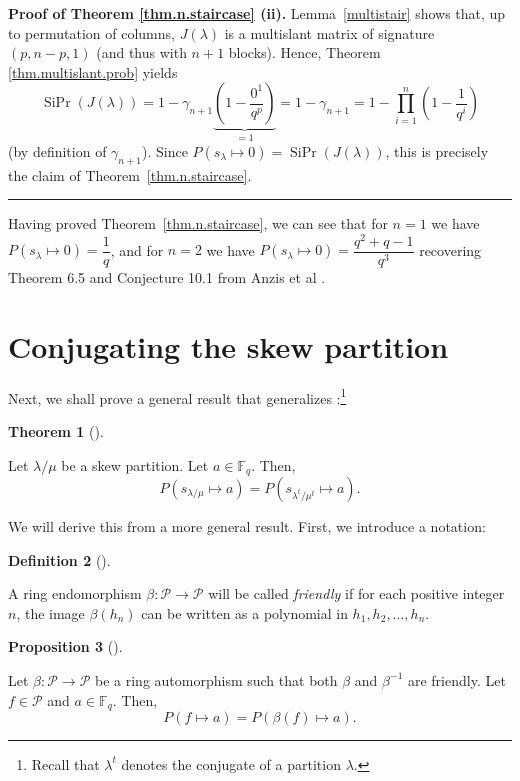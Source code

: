 \documentclass[numbers=enddot,12pt,final,onecolumn,notitlepage]{scrartcl}%
\theoremstyle{definition}
\newtheorem{theo}{Theorem}[section]
\newenvironment{theorem}[1][]
{\begin{theo}[#1]\begin{leftbar}}
{\end{leftbar}\end{theo}}
\newtheorem{prop}[theo]{Proposition}
\newenvironment{proposition}[1][]
{\begin{prop}[#1]\begin{leftbar}}
{\end{leftbar}\end{prop}}
\newtheorem{defi}[theo]{Definition}
\newenvironment{definition}[1][]
{\begin{defi}[#1]\begin{leftbar}}
{\end{leftbar}\end{defi}}
\newenvironment{proof}[1][Proof]{\noindent\textbf{#1.} }{\ \rule{0.5em}{0.5em}}
\let\prodnonlimits\prod
\renewcommand{\prod}{\prodnonlimits\limits}
\newcommand{\tup}[1]{\left( #1 \right)}
\theoremstyle{plainsl}
\begin{document}
\begin{proof}[Proof of Theorem \ref{thm.n.staircase} (ii)]
Lemma~\ref{multistair} shows that, up to permutation of columns,
$J(\lambda)$ is a multislant matrix of signature $(p, n-p, 1)$
(and thus with $n+1$ blocks).
Hence, Theorem \ref{thm.multislant.prob} yields
\[
\operatorname*{SiPr}\tup{J\tup{\lambda}}
= 1 - \gamma_{n+1} \underbrace{\tup{1 - \dfrac{0^1}{q^p}}}_{= 1}
= 1 - \gamma_{n+1}
= 1 - \prod_{i=1}^{n} \left(  1-\dfrac{1}{q^{i}}\right)
\]
(by definition of $\gamma_{n+1}$).
Since $P(s_{\lambda} \longmapsto 0) = \operatorname*{SiPr}\tup{J\tup{\lambda}}$,
this is precisely the claim of Theorem~\ref{thm.n.staircase}.
\end{proof}

Having proved Theorem~\ref{thm.n.staircase}, we can see that for $n=1$
we have
$P(s_{\lambda} \longmapsto 0) = \dfrac{1}{q}$, and for $n=2$ we have
$P(s_{\lambda} \longmapsto 0) = \dfrac{q^2+q-1}{q^3}$
recovering Theorem 6.5 and Conjecture 10.1 from Anzis et al \cite{Anzis18}.


\section{Conjugating the skew partition}

Next, we shall prove a general result that generalizes \cite[Corollary
3.3]{Anzis18}:\footnote{Recall that $\lambda^{t}$ denotes the conjugate of a
partition $\lambda$.}

\begin{theorem}
\label{thm.transpose}Let $\lambda/\mu$ be a skew partition. Let $a\in
\mathbb{F}_{q}$. Then,
\[
P\left(  s_{\lambda/\mu}\mapsto a\right)  =P\left(  s_{\lambda^{t}/\mu^{t}%
}\mapsto a\right)  .
\]

\end{theorem}

We will derive this from a more general result. First, we introduce a notation:

\begin{definition}
A ring endomorphism $\beta:\mathcal{P}\rightarrow\mathcal{P}$ will be called
\emph{friendly} if for each positive integer $n$, the image $\beta\left(
h_{n}\right)  $ can be written as a polynomial in $h_{1},h_{2},\ldots,h_{n}$.
\end{definition}

\begin{proposition}
\label{prop.friendly-aut}Let $\beta:\mathcal{P}\rightarrow\mathcal{P}$ be a
ring automorphism such that both $\beta$ and $\beta^{-1}$ are friendly. Let
$f\in\mathcal{P}$ and $a\in\mathbb{F}_{q}$. Then,%
\[
P\left(  f\mapsto a\right)  =P\left(  \beta\left(  f\right)  \mapsto a\right)
.
\]

\end{proposition}
\end{document}
